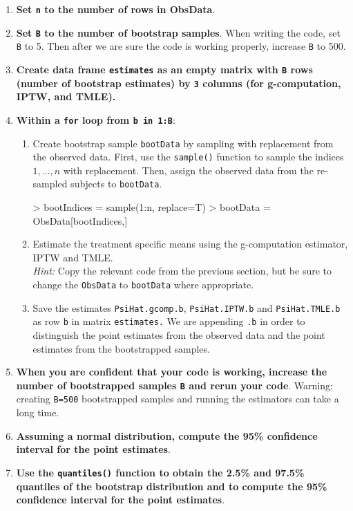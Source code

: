 \documentclass[answers]{exam}
\begin{document}
\begin{enumerate}
\item \textbf{Set \texttt{n} to the number of rows in ObsData}.
\item \textbf{Set \texttt{B} to the number of bootstrap samples}. When writing the code, set \texttt{B} to 5. Then after we are sure the code is working properly, increase \texttt{B} to 500.
\item \textbf{Create data frame \texttt{estimates} as an empty matrix with \texttt{B} rows (number of bootstrap estimates) by \texttt{3} columns (for g-computation, IPTW, and TMLE).}
\item \textbf{Within a \texttt{for} loop from \texttt{b in 1:B}}:
\begin{enumerate}
\item Create bootstrap sample \texttt{bootData} by sampling with replacement from the observed data. First, use the \texttt{sample()} function to sample the indices $1,\ldots,n$ with replacement. Then, assign the observed data from the re-sampled subjects to \texttt{bootData}. 
\begin{Schunk}
\begin{Sinput}
> bootIndices = sample(1:n, replace=T) 
> bootData = ObsData[bootIndices,]
\end{Sinput}
\end{Schunk}
\item Estimate the treatment specific means using the g-computation estimator, IPTW and TMLE.\\
\emph{Hint:} Copy the relevant code from the previous section, but be sure to change the \texttt{ObsData} to \texttt{bootData} where appropriate.
\item Save the estimates \texttt{PsiHat.gcomp.b}, \texttt{PsiHat.IPTW.b} and \texttt{PsiHat.TMLE.b} as row \texttt{b} in  matrix \texttt{estimates.} We are appending \texttt{.b} in  order to distinguish the point estimates from the observed data and the point estimates from the bootstrapped samples.
\end{enumerate}
\item \textbf{When you are confident that your code is working, increase the number of bootstrapped samples \texttt{B}  and rerun your code}. Warning: creating \texttt{B=500} bootstrapped samples and running the estimators can take a long time. 
\item \textbf{Assuming a normal distribution, compute the 95\% confidence interval for the point estimates}.
\item \textbf{Use the  \texttt{quantiles()} function to obtain the 2.5\% and 97.5\% quantiles of the bootstrap distribution and to compute the 95\% confidence interval for the point estimates}.
\end{enumerate}
\end{document}

